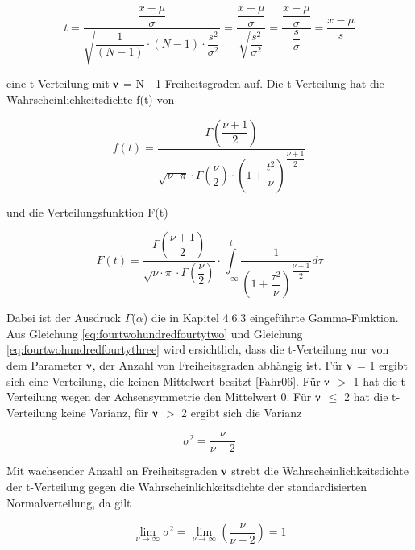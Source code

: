 \begin{equation}\label{eq:fourtwohundredfourtyone}
t=\dfrac{\dfrac{x-\mu }{\sigma } }{\sqrt{\dfrac{1}{(N-1)} \cdot (N-1)\cdot \dfrac{s^{2} }{\sigma ^{2}}}} =\dfrac{\dfrac{x-\mu }{\sigma} }{\sqrt{\dfrac{s^{2} }{\sigma ^{2}}}} =\dfrac{\dfrac{x-\mu }{\sigma}}{\dfrac{s}{\sigma } } =\dfrac{x-\mu}{s}
\end{equation}

\noindent eine t-Verteilung mit $\nuup$ = N - 1 Freiheitsgraden auf. Die t-Verteilung hat die Wahrscheinlichkeitsdichte f(t) von 

\begin{equation}\label{eq:fourtwohundredfourtytwo}
f(t)=\dfrac{\Gamma \left(\dfrac{\nu +1}{2} \right)}{\sqrt{\nu \cdot \pi} \cdot \Gamma \left(\dfrac{\nu}{2} \right)\cdot \left(1+\dfrac{t^{2} }{\nu} \right)^{\dfrac{\nu +1}{2}}}
\end{equation}

\noindent und die Verteilungsfunktion F(t) 

\begin{equation}\label{eq:fourtwohundredfourtythree}
F(t)=\dfrac{\Gamma \left(\dfrac{\nu +1}{2} \right)}{\sqrt{\nu \cdot \pi} \cdot \Gamma \left(\dfrac{\nu}{2} \right)} \cdot \int\limits _{-\infty }^{t}\dfrac{1}{\left(1+\dfrac{\tau ^{2} }{\nu} \right)^{\dfrac{\nu +1}{2}}} d\tau
\end{equation}


\noindent Dabei ist der Ausdruck $\Gamma$($\alpha$) die in Kapitel 4.6.3 eingef\"{u}hrte Gamma-Funktion. Aus Gleichung \eqref{eq:fourtwohundredfourtytwo} und Gleichung \eqref{eq:fourtwohundredfourtythree} wird ersichtlich, dass die t-Verteilung nur von dem Parameter $\nuup$, der Anzahl von Freiheitsgraden abh\"{a}ngig ist. F\"{u}r $\nuup$ = 1 ergibt sich eine Verteilung, die keinen Mittelwert besitzt [Fahr06]. F\"{u}r $\nuup$ $\mathrm{>}$ 1 hat die t-Verteilung wegen der Achsensymmetrie den Mittelwert 0. F\"{u}r $\nuup$ $\leq$ 2 hat die t-Verteilung keine Varianz, f\"{u}r $\nuup$ $\mathrm{>}$ 2 ergibt sich die Varianz 

\begin{equation}\label{eq:fourtwohundredfourtyfour}
\sigma ^{2} =\dfrac{\nu }{\nu -2}
\end{equation}

\noindent Mit wachsender Anzahl an Freiheitsgraden $\nuup$ strebt die Wahrscheinlichkeitsdichte der t-Verteilung gegen die Wahrscheinlichkeitsdichte der standardisierten Normalverteilung, da gilt

\begin{equation}\label{eq:fourtwohundredfourtyfive}
{\mathop{\lim }\limits_{\nu \to \infty }} \sigma ^{2} ={\mathop{\lim }\limits_{\nu \to \infty }} \left(\dfrac{\nu }{\nu -2} \right)=1
\end{equation}

